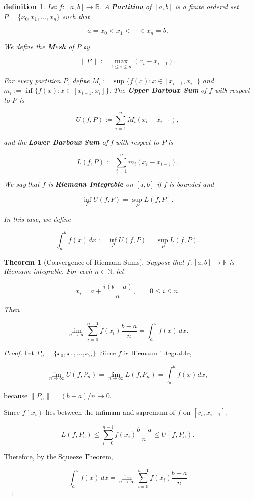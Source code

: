 \documentclass[10pt,a4paper]{book}
\newtheorem{definition}{definition}[section]
\newtheorem{theorem}{Theorem}[section]
\begin{document}
\begin{definition}

    Let $f:[a,b]\to\mathbb{R}$. A \textbf{Partition} of $[a,b]$ is a finite ordered
    set $P=\{x_0,x_1,\ldots,x_n\}$ such that

    $$
        a=x_0<x_1<\cdots<x_n=b.
    $$

    We define the \textbf{Mesh} of $P$ by

    $$
        \|P\|:=\max_{1\leq i\leq n}(x_i-x_{i-1}).
    $$

    For every partition $P$, define $M_i:=\sup\{f(x):x\in[x_{i-1},x_i]\}$ and
    $m_i:=\inf\{f(x):x\in[x_{i-1},x_i]\}$. The \textbf{Upper Darboux Sum} of $f$
    with respect to $P$ is

    $$
        U(f,P):=\sum_{i=1}^{n}M_i(x_i-x_{i-1}),
    $$

    and the \textbf{Lower Darboux Sum} of $f$ with respect to $P$ is

    $$
        L(f,P):=\sum_{i=1}^{n}m_i(x_i-x_{i-1}).
    $$

    We say that $f$ is \textbf{Riemann Integrable} on $[a,b]$ if $f$ is bounded and

    $$
        \inf_P U(f,P)=\sup_P L(f,P).
    $$

    In this case, we define

    $$
        \int_a^b f(x)\,dx
        :=\inf_P U(f,P)
        =\sup_P L(f,P).
    $$

\end{definition}
\begin{theorem}[Convergence of Riemann Sums]

    Suppose that $f:[a,b]\to\mathbb{R}$ is Riemann integrable. For each
    $n\in\mathbb{N}$, let

    $$
        x_i=a+\frac{i(b-a)}{n},
        \qquad 0\leq i\leq n.
    $$

    Then

    $$
        \lim_{n\to\infty}
        \sum_{i=0}^{n-1}f(x_i)\frac{b-a}{n}
        =
        \int_a^b f(x)\,dx.
    $$

\end{theorem}

\begin{proof}

    Let $P_n=\{x_0,x_1,\ldots,x_n\}$. Since $f$ is Riemann integrable,

    $$
        \lim_{n\to\infty}U(f,P_n)
        =
        \lim_{n\to\infty}L(f,P_n)
        =
        \int_a^b f(x)\,dx,
    $$

    because $\|P_n\|=(b-a)/n\to0$.

    Since $f(x_i)$ lies between the infimum and supremum of $f$ on $[x_i,x_{i+1}]$,

    $$
        L(f,P_n)
        \leq
        \sum_{i=0}^{n-1}f(x_i)\frac{b-a}{n}
        \leq
        U(f,P_n).
    $$

    Therefore, by the Squeeze Theorem,

    $$
        \int_a^b f(x)\,dx
        =
        \lim_{n\to\infty}
        \sum_{i=0}^{n-1}f(x_i)\frac{b-a}{n}
    $$

\end{proof}
\end{document}
